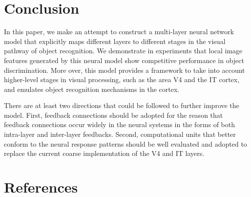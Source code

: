 \documentclass[5p]{elsarticle}
\begin{document}
\section{Conclusion}\label{sec:conclusion}

In this paper, we make an attempt 
to construct a multi-layer neural network model 
that explicitly maps different layers 
to different stages in the visual pathway of object recognition. 
We demonstrate in experiments that local image features 
generated by this neural model show competitive performance 
in object discrimination. 
More over, this model provides a framework 
to take into account higher-level stages in visual processing, 
such as the area V4 and the IT cortex, 
and emulates object recognition mechanisms in the cortex.

There are at least two directions that could be
followed to further improve the model.
First, feedback connections should be
adopted for the reason that feedback connections
occur widely in the neural systems in the forms 
of both intra-layer and inter-layer feedbacks.
Second, computational units that better 
conform to the neural response patterns should
be well evaluated and adopted 
to replace the current coarse implementation 
of the V4 and IT layers.

\section*{References}


\end{document}
